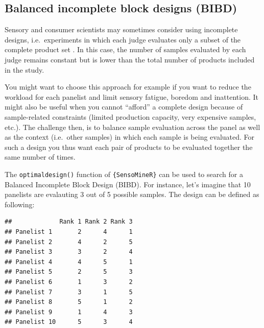 \documentclass[
]{krantz}
\makeatletter
\newenvironment{Shaded}{\begin{snugshade}}{\end{snugshade}}
\newcommand{\AttributeTok}[1]{\textcolor[rgb]{0.61,0.61,0.61}{#1}}
\newcommand{\DecValTok}[1]{\textcolor[rgb]{0.06,0.06,0.06}{#1}}
\newcommand{\FunctionTok}[1]{\textcolor[rgb]{0,0,0}{#1}}
\newcommand{\NormalTok}[1]{#1}
\newcommand{\OtherTok}[1]{\textcolor[rgb]{0.37,0.37,0.37}{#1}}
\newcommand{\SpecialCharTok}[1]{\textcolor[rgb]{0,0,0}{#1}}
\newenvironment{kframe}{%
\medskip{}
\setlength{\fboxsep}{.8em}
 \def\at@end@of@kframe{}%
 \ifinner\ifhmode%
  \def\at@end@of@kframe{\end{minipage}}%
  \begin{minipage}{\columnwidth}%
 \fi\fi%
 \def\FrameCommand##1{\hskip\@totalleftmargin \hskip-\fboxsep
 \colorbox{shadecolor}{##1}\hskip-\fboxsep
     \hskip-\linewidth \hskip-\@totalleftmargin \hskip\columnwidth}%
 \MakeFramed {\advance\hsize-\width
   \@totalleftmargin\z@ \linewidth\hsize
   \@setminipage}}%
 {\par\unskip\endMakeFramed%
 \at@end@of@kframe}
\renewenvironment{Shaded}{\begin{kframe}}{\end{kframe}}
\makeatother
\begin{document}
\hypertarget{BIBD}{%
\subsection{Balanced incomplete block designs (BIBD)}\label{BIBD}}

Sensory and consumer scientists may sometimes consider using incomplete designs, i.e.~experiments in which each judge evaluates only a subset of the complete product set \citep{Wakeling1995}. In this case, the number of samples evaluated by each judge remains constant but is lower than the total number of products included in the study.

You might want to choose this approach for example if you want to reduce the workload for each panelist and limit sensory fatigue, boredom and inattention. It might also be useful when you cannot ``afford'' a complete design because of sample-related constraints (limited production capacity, very expensive samples, etc.). The challenge then, is to balance sample evaluation across the panel as well as the context (i.e.~other samples) in which each sample is being evaluated. For such a design you thus want each pair of products to be evaluated together the same number of times.

The \texttt{optimaldesign()} function of \texttt{\{SensoMineR\}} can be used to search for a Balanced Incomplete Block Design (BIBD). For instance, let's imagine that 10 panelists are evalauting 3 out of 5 possible samples. The design can be defined as following:

\begin{Shaded}
\end{Shaded}

\begin{verbatim}
##             Rank 1 Rank 2 Rank 3
## Panelist 1       2      4      1
## Panelist 2       4      2      5
## Panelist 3       3      2      4
## Panelist 4       4      5      1
## Panelist 5       2      5      3
## Panelist 6       1      3      2
## Panelist 7       3      1      5
## Panelist 8       5      1      2
## Panelist 9       1      4      3
## Panelist 10      5      3      4
\end{verbatim}
\end{document}
